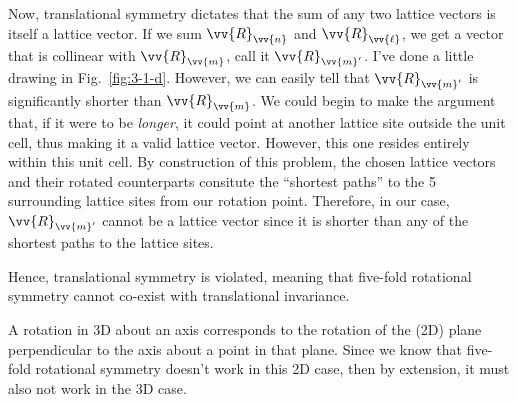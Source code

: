 \begin{parts}
  Now, translational symmetry dictates that the sum of any two lattice vectors is itself a lattice vector. If we sum $\vv{R}_{\vv{n}}$ and $\vv{R}_{\vv{\ell}}$, we get a vector that is collinear with $\vv{R}_{\vv{m}}$, call it $\vv{R}_{\vv{m}'}$. I've done a little drawing in Fig.~\ref{fig:3-1-d}. However, we can easily tell that $\vv{R}_{\vv{m}'}$ is significantly shorter than $\vv{R}_{\vv{m}}$. We could begin to make the argument that, if it were to be \textit{longer}, it could point at another lattice site outside the unit cell, thus making it a valid lattice vector. However, this one resides entirely within this unit cell. By construction of this problem, the chosen lattice vectors and their rotated counterparts consitute the ``shortest paths'' to the 5 surrounding lattice sites from our rotation point. Therefore, in our case, $\vv{R}_{\vv{m}'}$ cannot be a lattice vector since it is shorter than any of the shortest paths to the lattice sites.
  
  Hence, translational symmetry is violated, meaning that five-fold rotational symmetry cannot co-exist with translational invariance.

  A rotation in 3D about an axis corresponds to the rotation of the (2D) plane perpendicular to the axis about a point in that plane. Since we know that five-fold rotational symmetry doesn't work in this 2D case, then by extension, it must also not work in the 3D case.

\end{parts}

